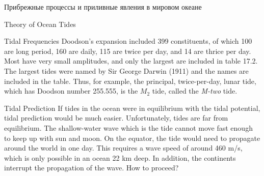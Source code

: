 \begin{chapter}{Прибрежные процессы и приливные явления в мировом океане}
\begin{section}{Theory of Ocean Tides}
\begin{paragraph}{Tidal Frequencies}
Doodson's expansion included 399 constituents, of which 100 are long
period, 160 are daily, 115 are twice per day, and 14 are thrice per
day. Most have very small amplitudes, and only the largest are
included in table 17.2. The largest tides were named by Sir George
Darwin (1911) and the names are included in the table.  Thus, for
example, the principal, twice-per-day, lunar tide, which has Doodson
number 255.555, is the $M_2$ tide, called the \textit{M-two} tide.
 
%
\end{paragraph}
\end{section}

\begin{section}{Tidal Prediction}
If tides in the ocean were in equilibrium with
the tidal potential, tidal prediction would be much
easier. Unfortunately, tides are far from equilibrium. The
shallow-water wave which is the tide cannot move fast enough to keep
up with sun and moon. On the equator, the tide would need to propagate
around the world in one day. This requires a wave speed of around 460
m/s, which is only possible in an ocean 22 km deep. In addition, the
continents interrupt the propagation of the wave. How to proceed?
%


\end{section}
\end{chapter}
